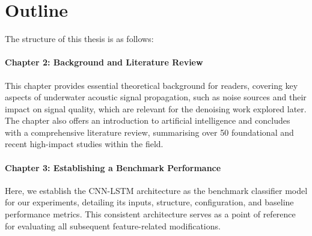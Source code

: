 

\section{Outline}

The structure of this thesis is as follows:

\paragraph{Chapter 2: Background and Literature Review} This chapter provides essential theoretical background for readers, covering key aspects of underwater acoustic signal propagation, such as noise sources and their impact on signal quality, which are relevant for the denoising work explored later. The chapter also offers an introduction to artificial intelligence and concludes with a comprehensive literature review, summarising over 50 foundational and recent high-impact studies within the field.

\paragraph{Chapter 3: Establishing a Benchmark Performance} Here, we establish the CNN-LSTM architecture as the benchmark classifier model for our experiments, detailing its inputs, structure, configuration, and baseline performance metrics. This consistent architecture serves as a point of reference for evaluating all subsequent feature-related modifications.

